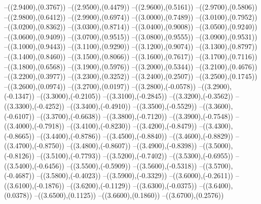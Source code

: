 {	--({\sx*(2.9400)},{\sy*(0.3767)})
	--({\sx*(2.9500)},{\sy*(0.4479)})
	--({\sx*(2.9600)},{\sy*(0.5161)})
	--({\sx*(2.9700)},{\sy*(0.5806)})
	--({\sx*(2.9800)},{\sy*(0.6412)})
	--({\sx*(2.9900)},{\sy*(0.6974)})
	--({\sx*(3.0000)},{\sy*(0.7489)})
	--({\sx*(3.0100)},{\sy*(0.7952)})
	--({\sx*(3.0200)},{\sy*(0.8362)})
	--({\sx*(3.0300)},{\sy*(0.8714)})
	--({\sx*(3.0400)},{\sy*(0.9008)})
	--({\sx*(3.0500)},{\sy*(0.9240)})
	--({\sx*(3.0600)},{\sy*(0.9409)})
	--({\sx*(3.0700)},{\sy*(0.9515)})
	--({\sx*(3.0800)},{\sy*(0.9555)})
	--({\sx*(3.0900)},{\sy*(0.9531)})
	--({\sx*(3.1000)},{\sy*(0.9443)})
	--({\sx*(3.1100)},{\sy*(0.9290)})
	--({\sx*(3.1200)},{\sy*(0.9074)})
	--({\sx*(3.1300)},{\sy*(0.8797)})
	--({\sx*(3.1400)},{\sy*(0.8460)})
	--({\sx*(3.1500)},{\sy*(0.8066)})
	--({\sx*(3.1600)},{\sy*(0.7617)})
	--({\sx*(3.1700)},{\sy*(0.7116)})
	--({\sx*(3.1800)},{\sy*(0.6568)})
	--({\sx*(3.1900)},{\sy*(0.5976)})
	--({\sx*(3.2000)},{\sy*(0.5344)})
	--({\sx*(3.2100)},{\sy*(0.4676)})
	--({\sx*(3.2200)},{\sy*(0.3977)})
	--({\sx*(3.2300)},{\sy*(0.3252)})
	--({\sx*(3.2400)},{\sy*(0.2507)})
	--({\sx*(3.2500)},{\sy*(0.1745)})
	--({\sx*(3.2600)},{\sy*(0.0974)})
	--({\sx*(3.2700)},{\sy*(0.0197)})
	--({\sx*(3.2800)},{\sy*(-0.0578)})
	--({\sx*(3.2900)},{\sy*(-0.1347)})
	--({\sx*(3.3000)},{\sy*(-0.2105)})
	--({\sx*(3.3100)},{\sy*(-0.2845)})
	--({\sx*(3.3200)},{\sy*(-0.3562)})
	--({\sx*(3.3300)},{\sy*(-0.4252)})
	--({\sx*(3.3400)},{\sy*(-0.4910)})
	--({\sx*(3.3500)},{\sy*(-0.5529)})
	--({\sx*(3.3600)},{\sy*(-0.6107)})
	--({\sx*(3.3700)},{\sy*(-0.6638)})
	--({\sx*(3.3800)},{\sy*(-0.7120)})
	--({\sx*(3.3900)},{\sy*(-0.7548)})
	--({\sx*(3.4000)},{\sy*(-0.7918)})
	--({\sx*(3.4100)},{\sy*(-0.8230)})
	--({\sx*(3.4200)},{\sy*(-0.8479)})
	--({\sx*(3.4300)},{\sy*(-0.8665)})
	--({\sx*(3.4400)},{\sy*(-0.8786)})
	--({\sx*(3.4500)},{\sy*(-0.8840)})
	--({\sx*(3.4600)},{\sy*(-0.8829)})
	--({\sx*(3.4700)},{\sy*(-0.8750)})
	--({\sx*(3.4800)},{\sy*(-0.8607)})
	--({\sx*(3.4900)},{\sy*(-0.8398)})
	--({\sx*(3.5000)},{\sy*(-0.8126)})
	--({\sx*(3.5100)},{\sy*(-0.7793)})
	--({\sx*(3.5200)},{\sy*(-0.7402)})
	--({\sx*(3.5300)},{\sy*(-0.6955)})
	--({\sx*(3.5400)},{\sy*(-0.6456)})
	--({\sx*(3.5500)},{\sy*(-0.5909)})
	--({\sx*(3.5600)},{\sy*(-0.5318)})
	--({\sx*(3.5700)},{\sy*(-0.4687)})
	--({\sx*(3.5800)},{\sy*(-0.4023)})
	--({\sx*(3.5900)},{\sy*(-0.3329)})
	--({\sx*(3.6000)},{\sy*(-0.2611)})
	--({\sx*(3.6100)},{\sy*(-0.1876)})
	--({\sx*(3.6200)},{\sy*(-0.1129)})
	--({\sx*(3.6300)},{\sy*(-0.0375)})
	--({\sx*(3.6400)},{\sy*(0.0378)})
	--({\sx*(3.6500)},{\sy*(0.1125)})
	--({\sx*(3.6600)},{\sy*(0.1860)})
	--({\sx*(3.6700)},{\sy*(0.2576)})
}
